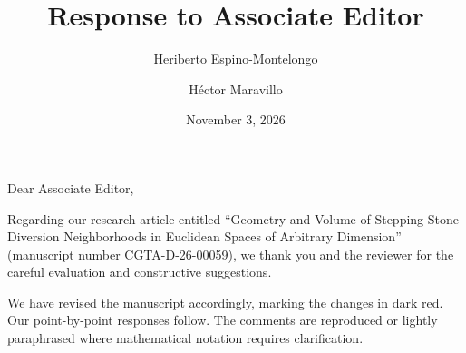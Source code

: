 \documentclass[11pt]{article}
\title{Response to Associate Editor}
\author{Heriberto Espino-Montelongo \and H\'ector Maravillo}
\date{November 3, 2026}
\begin{document}
\maketitle

\noindent Dear Associate Editor,

Regarding our research article entitled ``Geometry and Volume of
Stepping-Stone Diversion Neighborhoods in Euclidean Spaces of Arbitrary
Dimension'' (manuscript number CGTA-D-26-00059), we thank you and the
reviewer for the careful evaluation and constructive suggestions.

We have revised the manuscript accordingly, marking the changes in dark red.
Our point-by-point responses follow. The comments are reproduced or
lightly paraphrased where mathematical notation requires clarification.
\end{document}
